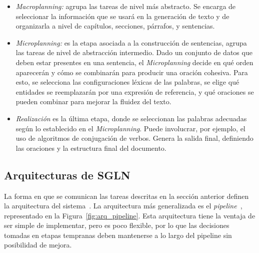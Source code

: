 \begin{itemize}
    \item  \emph{Macroplanning:} agrupa las tareas de nivel más abstracto. Se encarga de seleccionar la información que se usará en la generación de texto y de organizarla a nivel de capítulos, secciones, párrafos, y sentencias.
    \item \emph{Microplanning:} es la etapa asociada a la construcción de sentencias, agrupa las tareas de nivel de abstracción intermedio. Dado un conjunto de datos que deben estar presentes en una sentencia, el \emph{Microplanning} decide en qué orden aparecerán y cómo se combinarán para producir una oración cohesiva. 
    Para esto, se selecciona las configuraciones léxicas de las palabras, se elige qué entidades se reemplazarán por una expresión de referencia, y qué oraciones se pueden combinar para mejorar la fluidez del texto.
    \item \emph{Realización} es la última etapa, donde se seleccionan las palabras adecuadas según lo establecido en el \emph{Microplanning}. Puede involucrar, por ejemplo, el uso de algoritmos de conjugación de verbos. 
    Genera la salida final, definiendo las oraciones y la estructura final del documento.
\end{itemize}

\subsection{Arquitecturas de SGLN}
La forma en que se comunican las tareas descritas en la sección anterior definen la arquitectura del sistema~\cite{ibanez2004arquitectura}. La arquitectura más generalizada es el \emph{pipeline}~\cite{hervas2008descripcion}, representado en la Figura~\ref{fig:arq_pipeline}.
Esta arquitectura tiene la ventaja de ser simple de implementar, pero es poco flexible, por lo que las decisiones tomadas en etapas tempranas deben mantenerse a lo largo del pipeline sin posibilidad de mejora.

